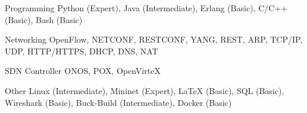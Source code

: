 

\begin{cvskills}

  \cvskill
    {Programming} %
    {Python (Expert), Java (Intermediate), Erlang (Basic), C/C++ (Basic),
      Bash (Basic)} %

  \cvskill
    {Networking} %
    {OpenFlow, NETCONF, RESTCONF, YANG, REST, ARP, TCP/IP, UDP, HTTP/HTTPS,
      DHCP, DNS, NAT} %

  \cvskill
    {SDN Controller} %
    {ONOS, POX, OpenVirteX} %

  \cvskill
    {Other} %
    {Linux (Intermediate), Mininet (Expert), LaTeX (Basic), SQL (Basic), Wireshark (Basic),
     Buck-Build (Intermediate), Docker (Basic)} %
\end{cvskills}